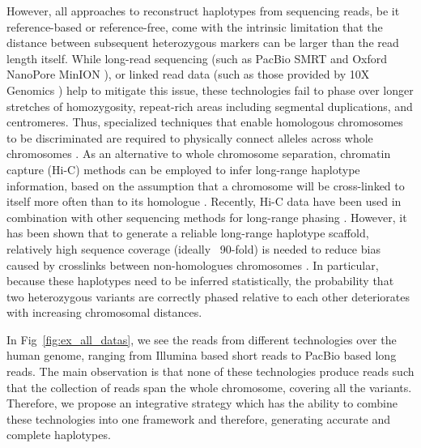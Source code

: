 However, all approaches to reconstruct haplotypes from sequencing reads, be it reference-based or reference-free, come with the intrinsic limitation that the distance between subsequent heterozygous markers can be larger than the read length itself. 
While long-read sequencing (such as PacBio SMRT \citep{steinberg2014single} and Oxford NanoPore MinION \citep{ammar2015long}), or linked read data (such as those provided by 10X Genomics \citep{zheng2016haplotyping}) help to mitigate this issue, 
these technologies fail to phase over longer stretches of homozygosity, repeat-rich areas including segmental duplications, and centromeres. 
Thus, specialized techniques that enable homologous chromosomes to be discriminated are required to physically connect alleles across whole chromosomes \citep{zheng2016haplotyping, ma2010direct, yang2011completely}. 
As an alternative to whole chromosome separation, chromatin capture (Hi-C) methods \citep{lieberman2009comprehensive} can be employed to infer long-range haplotype information, based on the assumption that a chromosome will be cross-linked to itself more often than to its homologue \citep{selvaraj2013whole}.
Recently, Hi-C data have been used in combination with other sequencing methods for long-range phasing \citep{edge2017hapcut2, ben2016extending}. 
However, it has been shown that to generate a reliable long-range haplotype scaffold, relatively high sequence coverage (ideally ~90-fold) is needed to reduce bias caused by crosslinks between non-homologues chromosomes \citep{edge2017hapcut2}. 
In particular, because these haplotypes need to be inferred statistically, the probability that two heterozygous variants are correctly phased relative to each other deteriorates with increasing chromosomal distances.

In Fig~\ref{fig:ex_all_datas}, we see the reads from different technologies over the human genome, ranging from Illumina based short reads to PacBio based long reads.
The main observation is that none of these technologies produce reads such that the collection of reads span the whole chromosome, covering all the variants.
Therefore, we propose an integrative strategy which has the ability to combine these technologies into one framework and therefore, generating accurate and complete haplotypes.

